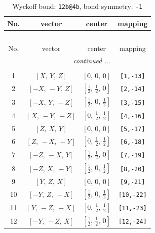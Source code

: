 \documentclass[fleqn,8pt]{jsarticle}
\begin{document}
\renewcommand{\arraystretch}{1.2}
\begin{longtable}{cccc}
\caption{Wyckoff bond: {\tt 12b@4b}, bond symmetry: {\tt -1}}
 \\
 \hline \hline
No. & vector & center & mapping \\ \hline \endfirsthead

\multicolumn{3}{l}{\tablename\ \thetable{}} \\
 \hline \hline
No. & vector & center & mapping \\ \hline \endhead

 \hline \hline
\multicolumn{3}{r}{\footnotesize\it continued ...} \\ \endfoot

 \hline \hline
\multicolumn{3}{r}{} \\ \endlastfoot

1 & $\left[ X,\, Y,\, Z \right]$ & $\left[ 0,\, 0,\, 0 \right]$ & {\tt [1,-13]} \\ \hline
2 & $\left[ - X,\, - Y,\, Z \right]$ & $\left[ \frac{1}{2},\, \frac{1}{2},\, 0 \right]$ & {\tt [2,-14]} \\ \hline
3 & $\left[ - X,\, Y,\, - Z \right]$ & $\left[ \frac{1}{2},\, 0,\, \frac{1}{2} \right]$ & {\tt [3,-15]} \\ \hline
4 & $\left[ X,\, - Y,\, - Z \right]$ & $\left[ 0,\, \frac{1}{2},\, \frac{1}{2} \right]$ & {\tt [4,-16]} \\ \hline
5 & $\left[ Z,\, X,\, Y \right]$ & $\left[ 0,\, 0,\, 0 \right]$ & {\tt [5,-17]} \\ \hline
6 & $\left[ Z,\, - X,\, - Y \right]$ & $\left[ 0,\, \frac{1}{2},\, \frac{1}{2} \right]$ & {\tt [6,-18]} \\ \hline
7 & $\left[ - Z,\, - X,\, Y \right]$ & $\left[ \frac{1}{2},\, \frac{1}{2},\, 0 \right]$ & {\tt [7,-19]} \\ \hline
8 & $\left[ - Z,\, X,\, - Y \right]$ & $\left[ \frac{1}{2},\, 0,\, \frac{1}{2} \right]$ & {\tt [8,-20]} \\ \hline
9 & $\left[ Y,\, Z,\, X \right]$ & $\left[ 0,\, 0,\, 0 \right]$ & {\tt [9,-21]} \\ \hline
10 & $\left[ - Y,\, Z,\, - X \right]$ & $\left[ \frac{1}{2},\, 0,\, \frac{1}{2} \right]$ & {\tt [10,-22]} \\ \hline
11 & $\left[ Y,\, - Z,\, - X \right]$ & $\left[ 0,\, \frac{1}{2},\, \frac{1}{2} \right]$ & {\tt [11,-23]} \\ \hline
12 & $\left[ - Y,\, - Z,\, X \right]$ & $\left[ \frac{1}{2},\, \frac{1}{2},\, 0 \right]$ & {\tt [12,-24]} \\
\end{longtable}
\end{document}
